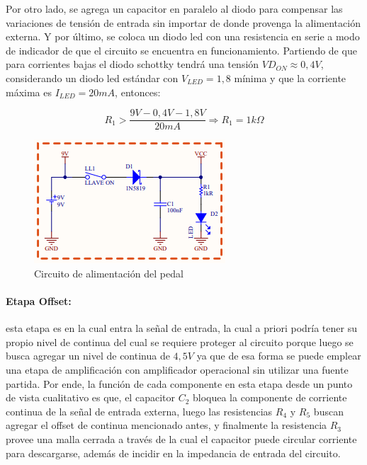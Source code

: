 Por otro lado, se agrega un capacitor en paralelo al diodo para compensar las variaciones de tensi\'on de entrada sin importar de donde provenga la alimentaci\'on externa. Y por \'ultimo,
se coloca un diodo led con una resistencia en serie a modo de indicador de que el circuito se encuentra en funcionamiento. Partiendo de que para corrientes bajas el diodo schottky tendr\'a
una tensi\'on $VD_{ON} \approx 0,4V$, considerando un diodo led est\'andar con $V_{LED} = 1,8$ m\'inima y que la corriente m\'axima es $I_{LED} = 20mA$, entonces:

\begin{equation}
    R_1 > \frac{9V - 0,4V - 1,8V}{20mA}
    \Rightarrow R_1 = 1k \Omega
\end{equation}

\begin{figure}[H]
    \centering
    \includegraphics[]{../EJ5/Recursos/circuito_alimentacion.PNG}
    \caption{Circuito de alimentaci\'on del pedal}
    \label{fig:circuito_alimentacion}
\end{figure}

\paragraph*{Etapa Offset:} esta etapa es en la cual entra la se\~nal de entrada, la cual a priori podr\'ia tener su propio nivel de continua
del cual se requiere proteger al circuito porque luego se busca agregar un nivel de continua de $4,5 V$ ya que de esa forma se puede emplear
una etapa de amplificaci\'on con amplificador operacional sin utilizar una fuente partida. Por ende, la funci\'on de cada componente en esta etapa
desde un punto de vista cualitativo es que, el capacitor $C_2$ bloquea la componente de corriente continua de la se\~nal de entrada externa, luego las resistencias
$R_4$ y $R_5$ buscan agregar el offset de continua mencionado antes, y finalmente la resistencia $R_3$ provee una malla cerrada a trav\'es de la cual el capacitor puede
circular corriente para descargarse, adem\'as de incidir en la impedancia de entrada del circuito.

